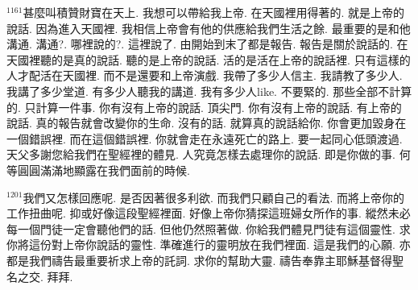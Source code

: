 \documentclass{book}
\begin{document}
$^{1161}$甚麼叫積贊財寶在天上.
我想可以帶給我上帝.
在天國裡用得著的.
就是上帝的說話.
因為進入天國裡.
我相信上帝會有他的供應給我們生活之餘.
最重要的是和他溝通.
溝通?.
哪裡說的?.
這裡說了.
由開始到末了都是報告.
報告是關於說話的.
在天國裡聽的是真的說話.
聽的是上帝的說話.
活的是活在上帝的說話裡.
只有這樣的人才配活在天國裡.
而不是還要和上帝演戲.
我帶了多少人信主.
我請教了多少人.
我講了多少堂道.
有多少人聽我的講道.
我有多少人like.
不要緊的.
那些全部不計算的.
只計算一件事.
你有沒有上帝的說話.
頂尖門.
你有沒有上帝的說話.
有上帝的說話.
真的報告就會改變你的生命.
沒有的話.
就算真的說話給你.
你會更加毀身在一個錯誤裡.
而在這個錯誤裡.
你就會走在永遠死亡的路上.
要一起同心低頭渡過.
天父多謝您給我們在聖經裡的體見.
人究竟怎樣去處理你的說話.
即是你做的事.
何等圓圓滿滿地顯露在我們面前的時候.

$^{1201}$我們又怎樣回應呢.
是否因著很多利欲.
而我們只顧自己的看法.
而將上帝你的工作扭曲呢.
抑或好像這段聖經裡面.
好像上帝你猜探這班婦女所作的事.
縱然未必每一個門徒一定會聽他們的話.
但他仍然照著做.
你給我們體見門徒有這個靈性.
求你將這份對上帝你說話的靈性.
準確進行的靈明放在我們裡面.
這是我們的心願.
亦都是我們禱告最重要祈求上帝的託詞.
求你的幫助大靈.
禱告奉靠主耶穌基督得聖名之交.
拜拜.
\newpage

\allsectionsfont{\centering}

\setlength\parindent{0pt}
\setlength{\columnsep}{1.25em}
\setlength{\parfillskip}{0pt}
\setlength{\tabcolsep}{1em}
\raggedbottom



\newfontfamily{}
\newfontfamily{}
\newfontfamily{}
\newfontfamily{}
\newfontfamily{}
\newcommand{\chfont}[1]{\centerfont{\huge\textcolor{hcolor}{#1}}}
\newcommand{\leftcitation}[1]{\leftcitationfont{\Large\textcolor{hcolor}{#1}}}
\newcommand{\rightcitation}[1]{\rightcitationfont{\normalsize\textcolor{rcolor}{#1}}}
\newfontfamily{}
\end{document}
